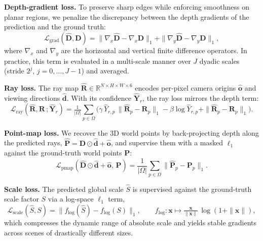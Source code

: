 \documentclass{llmxive}
\begin{document}
\noindent\textbf{Depth-gradient loss.}
To preserve sharp edges while enforcing smoothness on planar regions, we penalize the discrepancy between the depth gradients of the prediction and the ground truth:
\begin{equation}
\mathcal{L}_{\text{grad}}(\hat{\mathbf{D}},\mathbf{D}) = \|\nabla_x \hat{\mathbf{D}} - \nabla_x \mathbf{D}\|_1 + \|\nabla_y \hat{\mathbf{D}} - \nabla_y \mathbf{D}\|_1,
\end{equation}
where $\nabla_x$ and $\nabla_y$ are the horizontal and vertical finite difference operators. In practice, this term is evaluated in a multi-scale manner over $J$ dyadic scales (stride $2^{j}$, $j=0,\dots,J\!-\!1$) and averaged.

\noindent\textbf{Ray loss.}
The ray map $\hat{\mathbf{R}}\in\mathbb{R}^{N\times H\times W\times 6}$ encodes per-pixel camera origins $\hat{\mathbf{o}}$ and viewing directions $\hat{\mathbf{d}}$. With its confidence $\hat{\mathbf{Y}}_r$, the ray loss mirrors the depth term:
\begin{equation}
\mathcal{L}_{\text{ray}}(\hat{\mathbf{R}},\mathbf{R}\,;\hat{\mathbf{Y}}_r)
= \tfrac{1}{|\Omega|}\sum_{p\in\Omega}\!\Big(
\gamma\,\hat{Y}_{r,p}\,\|\hat{\mathbf{R}}_p - \mathbf{R}_p\|_1 - \beta\log \hat{Y}_{r,p} + \|\hat{\mathbf{R}}_p - \mathbf{R}_p\|_1
\Big).
\end{equation}

\noindent\textbf{Point-map loss.}
We recover the 3D world points by back-projecting depth along the predicted rays, $\hat{\mathbf{P}} = \hat{\mathbf{D}}\odot\hat{\mathbf{d}} + \hat{\mathbf{o}}$, and supervise them with a masked $\ell_1$ against the ground-truth world points $\mathbf{P}$:
\begin{equation}
\mathcal{L}_{\text{pmap}}(\hat{\mathbf{D}}\odot\hat{\mathbf{d}}+\hat{\mathbf{o}},\,\mathbf{P}) = \frac{1}{|\Omega|}\sum_{p\in\Omega}\big\|\hat{\mathbf{P}}_p - \mathbf{P}_p \big\|_1.
\end{equation}

\noindent\textbf{Scale loss.}
The predicted global scale $\hat{S}$ is supervised against the ground-truth scale factor $S$ via a log-space $\ell_1$ term,
\begin{equation}
\mathcal{L}_{\text{scale}}(\hat{S},S) = \big\| f_{\log}(\hat{S}) - f_{\log}(S) \big\|_1,\qquad
f_{\log}:\mathbf{x}\mapsto \tfrac{\mathbf{x}}{\|\mathbf{x}\|}\,\log(1+\|\mathbf{x}\|),
\end{equation}
which compresses the dynamic range of absolute scale and yields stable gradients across scenes of drastically different sizes.
\end{document}
